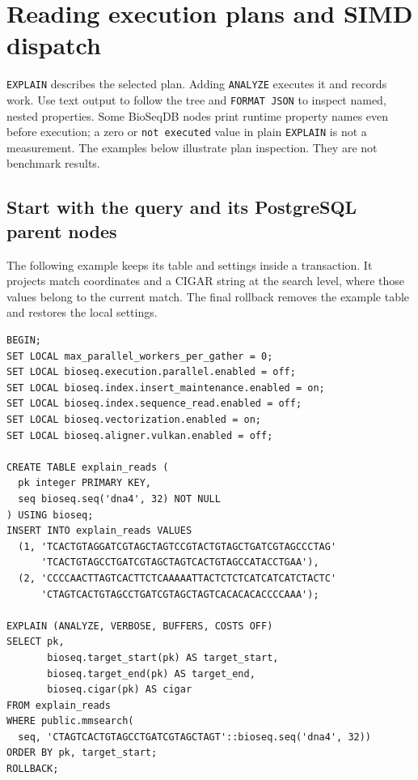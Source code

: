 \section{Reading execution plans and SIMD dispatch}
\label{sec:appendix-explain}

\texttt{EXPLAIN} describes the selected plan. Adding \texttt{ANALYZE} executes
it and records work. Use text output to follow the tree and
\texttt{FORMAT JSON} to inspect named, nested properties. Some BioSeqDB nodes
print runtime property names even before execution; a zero or
\texttt{not executed} value in plain \texttt{EXPLAIN} is not a measurement.
The examples below illustrate plan inspection. They are not benchmark results.

\subsection{Start with the query and its PostgreSQL parent nodes}

The following example keeps its table and settings inside a transaction.
It projects match coordinates and a CIGAR string at the search level, where
those values belong to the current match. The final rollback removes the
example table and restores the local settings.

\par\noindent\begin{minipage}{\linewidth}
\begin{lstlisting}[style=bioseq-appendix-sql]
BEGIN;
SET LOCAL max_parallel_workers_per_gather = 0;
SET LOCAL bioseq.execution.parallel.enabled = off;
SET LOCAL bioseq.index.insert_maintenance.enabled = on;
SET LOCAL bioseq.index.sequence_read.enabled = off;
SET LOCAL bioseq.vectorization.enabled = on;
SET LOCAL bioseq.aligner.vulkan.enabled = off;

CREATE TABLE explain_reads (
  pk integer PRIMARY KEY,
  seq bioseq.seq('dna4', 32) NOT NULL
) USING bioseq;
INSERT INTO explain_reads VALUES
  (1, 'TCACTGTAGGATCGTAGCTAGTCCGTACTGTAGCTGATCGTAGCCCTAG'
      'TCACTGTAGCCTGATCGTAGCTAGTCACTGTAGCCATACCTGAA'),
  (2, 'CCCCAACTTAGTCACTTCTCAAAAATTACTCTCTCATCATCATCTACTC'
      'CTAGTCACTGTAGCCTGATCGTAGCTAGTCACACACACCCCAAA');

EXPLAIN (ANALYZE, VERBOSE, BUFFERS, COSTS OFF)
SELECT pk,
       bioseq.target_start(pk) AS target_start,
       bioseq.target_end(pk) AS target_end,
       bioseq.cigar(pk) AS cigar
FROM explain_reads
WHERE public.mmsearch(
  seq, 'CTAGTCACTGTAGCCTGATCGTAGCTAGT'::bioseq.seq('dna4', 32))
ORDER BY pk, target_start;
ROLLBACK;
\end{lstlisting}
\end{minipage}

